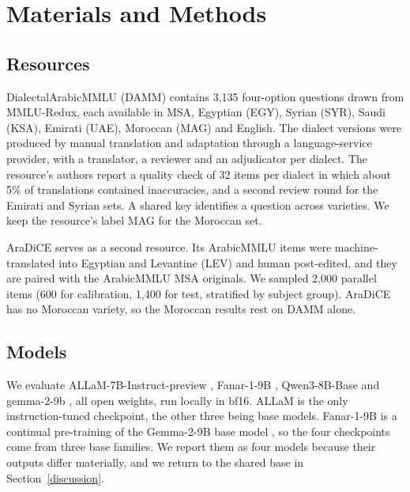 \documentclass[applsci,article,submit,pdftex,oneauthor]{Definitions/mdpi}
\begin{document}
\hypertarget{materials-and-methods}{%
\section{Materials and Methods}\label{materials-and-methods}}

\hypertarget{resources}{%
\subsection{Resources}\label{resources}}

DialectalArabicMMLU (DAMM) \cite{altakrori2026dialectalarabicmmlu} contains 3,135 four-option questions drawn from MMLU-Redux, each available in MSA, Egyptian (EGY), Syrian (SYR), Saudi (KSA), Emirati (UAE), Moroccan (MAG) and English. The dialect versions were produced by manual translation and adaptation through a language-service provider, with a translator, a reviewer and an adjudicator per dialect. The resource's authors report a quality check of 32 items per dialect in which about 5\% of translations contained inaccuracies, and a second review round for the Emirati and Syrian sets. A shared key identifies a question across varieties. We keep the resource's label MAG for the Moroccan set.

AraDiCE \cite{mousi2025aradice} serves as a second resource. Its ArabicMMLU items \cite{koto2024arabicmmlu} were machine-translated into Egyptian and Levantine (LEV) and human post-edited, and they are paired with the ArabicMMLU MSA originals. We sampled 2,000 parallel items (600 for calibration, 1,400 for test, stratified by subject group). AraDiCE has no Moroccan variety, so the Moroccan results rest on DAMM alone.

\hypertarget{models}{%
\subsection{Models}\label{models}}

We evaluate ALLaM-7B-Instruct-preview \cite{bari2025allam}, Fanar-1-9B \cite{fanar2025}, Qwen3-8B-Base \cite{qwen3} and gemma-2-9b \cite{gemma2}, all open weights, run locally in bf16. ALLaM is the only instruction-tuned checkpoint, the other three being base models. Fanar-1-9B is a continual pre-training of the Gemma-2-9B base model \cite{fanar2025}, so the four checkpoints come from three base families. We report them as four models because their outputs differ materially, and we return to the shared base in Section~\ref{discussion}.
\end{document}
